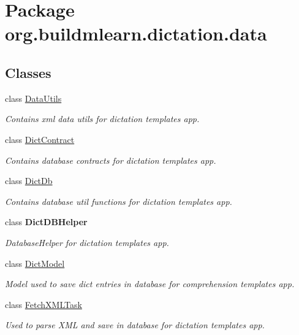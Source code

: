 \hypertarget{namespaceorg_1_1buildmlearn_1_1dictation_1_1data}{}\section{Package org.\+buildmlearn.\+dictation.\+data}
\label{namespaceorg_1_1buildmlearn_1_1dictation_1_1data}
\subsection*{Classes}
\begin{DoxyCompactItemize}
\item 
class \hyperlink{classorg_1_1buildmlearn_1_1dictation_1_1data_1_1DataUtils}{Data\+Utils}
\begin{DoxyCompactList}\small\item\em Contains xml data utils for dictation template\textquotesingle{}s app. \end{DoxyCompactList}\item 
class \hyperlink{classorg_1_1buildmlearn_1_1dictation_1_1data_1_1DictContract}{Dict\+Contract}
\begin{DoxyCompactList}\small\item\em Contains database contracts for dictation template\textquotesingle{}s app. \end{DoxyCompactList}\item 
class \hyperlink{classorg_1_1buildmlearn_1_1dictation_1_1data_1_1DictDb}{Dict\+Db}
\begin{DoxyCompactList}\small\item\em Contains database util functions for dictation template\textquotesingle{}s app. \end{DoxyCompactList}\item 
class {\bfseries Dict\+D\+B\+Helper}
\begin{DoxyCompactList}\small\item\em Database\+Helper for dictation template\textquotesingle{}s app. \end{DoxyCompactList}\item 
class \hyperlink{classorg_1_1buildmlearn_1_1dictation_1_1data_1_1DictModel}{Dict\+Model}
\begin{DoxyCompactList}\small\item\em Model used to save dict entries in database for comprehension template\textquotesingle{}s app. \end{DoxyCompactList}\item 
class \hyperlink{classorg_1_1buildmlearn_1_1dictation_1_1data_1_1FetchXMLTask}{Fetch\+X\+M\+L\+Task}
\begin{DoxyCompactList}\small\item\em Used to parse X\+ML and save in database for dictation template\textquotesingle{}s app. \end{DoxyCompactList}\end{DoxyCompactItemize}

